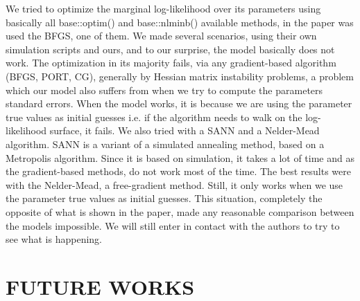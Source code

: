 We tried to optimize the marginal log-likelihood over its parameters
using basically all base::optim() and base::nlminb() available methods,
in the paper was used the BFGS, one of them. We made several scenarios,
using their own simulation scripts and ours, and to our surprise, the
model basically does not work. The optimization in its majority fails,
via any gradient-based algorithm (BFGS, PORT, CG), generally by Hessian
matrix instability problems, a problem which our model also suffers from
when we try to compute the parameters standard errors. When the model
works, it is because we are using the parameter true values as initial
guesses i.e. if the algorithm needs to walk on the log-likelihood
surface, it fails. We also tried with a SANN and a Nelder-Mead
algorithm. SANN is a variant of a simulated annealing method, based on a
Metropolis algorithm. Since it is based on simulation, it takes a lot of
time and as the gradient-based methods, do not work most of the
time. The best results were with the Nelder-Mead, a free-gradient
method. Still, it only works when we use the parameter true values as
initial guesses. This situation, completely the opposite of what is
shown in the paper, made any reasonable comparison between the models
impossible. We will still enter in contact with the authors to try to
see what is happening.

\section{FUTURE WORKS}
\label{cap:future}

